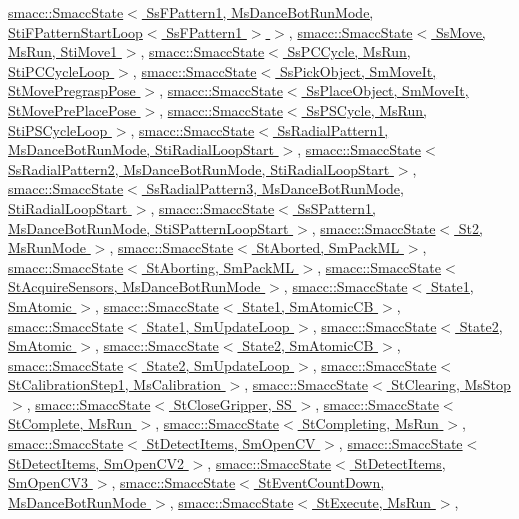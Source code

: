 \hyperlink{classsmacc_1_1SmaccState}{smacc\+::\+Smacc\+State$<$ Ss\+F\+Pattern1, Ms\+Dance\+Bot\+Run\+Mode, Sti\+F\+Pattern\+Start\+Loop$<$ Ss\+F\+Pattern1 $>$ $>$}, \hyperlink{classsmacc_1_1SmaccState}{smacc\+::\+Smacc\+State$<$ Ss\+Move, Ms\+Run, Sti\+Move1 $>$}, \hyperlink{classsmacc_1_1SmaccState}{smacc\+::\+Smacc\+State$<$ Ss\+P\+C\+Cycle, Ms\+Run, Sti\+P\+C\+Cycle\+Loop $>$}, \hyperlink{classsmacc_1_1SmaccState}{smacc\+::\+Smacc\+State$<$ Ss\+Pick\+Object, Sm\+Move\+It, St\+Move\+Pregrasp\+Pose $>$}, \hyperlink{classsmacc_1_1SmaccState}{smacc\+::\+Smacc\+State$<$ Ss\+Place\+Object, Sm\+Move\+It, St\+Move\+Pre\+Place\+Pose $>$}, \hyperlink{classsmacc_1_1SmaccState}{smacc\+::\+Smacc\+State$<$ Ss\+P\+S\+Cycle, Ms\+Run, Sti\+P\+S\+Cycle\+Loop $>$}, \hyperlink{classsmacc_1_1SmaccState}{smacc\+::\+Smacc\+State$<$ Ss\+Radial\+Pattern1, Ms\+Dance\+Bot\+Run\+Mode, Sti\+Radial\+Loop\+Start $>$}, \hyperlink{classsmacc_1_1SmaccState}{smacc\+::\+Smacc\+State$<$ Ss\+Radial\+Pattern2, Ms\+Dance\+Bot\+Run\+Mode, Sti\+Radial\+Loop\+Start $>$}, \hyperlink{classsmacc_1_1SmaccState}{smacc\+::\+Smacc\+State$<$ Ss\+Radial\+Pattern3, Ms\+Dance\+Bot\+Run\+Mode, Sti\+Radial\+Loop\+Start $>$}, \hyperlink{classsmacc_1_1SmaccState}{smacc\+::\+Smacc\+State$<$ Ss\+S\+Pattern1, Ms\+Dance\+Bot\+Run\+Mode, Sti\+S\+Pattern\+Loop\+Start $>$}, \hyperlink{classsmacc_1_1SmaccState}{smacc\+::\+Smacc\+State$<$ St2, Ms\+Run\+Mode $>$}, \hyperlink{classsmacc_1_1SmaccState}{smacc\+::\+Smacc\+State$<$ St\+Aborted, Sm\+Pack\+M\+L $>$}, \hyperlink{classsmacc_1_1SmaccState}{smacc\+::\+Smacc\+State$<$ St\+Aborting, Sm\+Pack\+M\+L $>$}, \hyperlink{classsmacc_1_1SmaccState}{smacc\+::\+Smacc\+State$<$ St\+Acquire\+Sensors, Ms\+Dance\+Bot\+Run\+Mode $>$}, \hyperlink{classsmacc_1_1SmaccState}{smacc\+::\+Smacc\+State$<$ State1, Sm\+Atomic $>$}, \hyperlink{classsmacc_1_1SmaccState}{smacc\+::\+Smacc\+State$<$ State1, Sm\+Atomic\+C\+B $>$}, \hyperlink{classsmacc_1_1SmaccState}{smacc\+::\+Smacc\+State$<$ State1, Sm\+Update\+Loop $>$}, \hyperlink{classsmacc_1_1SmaccState}{smacc\+::\+Smacc\+State$<$ State2, Sm\+Atomic $>$}, \hyperlink{classsmacc_1_1SmaccState}{smacc\+::\+Smacc\+State$<$ State2, Sm\+Atomic\+C\+B $>$}, \hyperlink{classsmacc_1_1SmaccState}{smacc\+::\+Smacc\+State$<$ State2, Sm\+Update\+Loop $>$}, \hyperlink{classsmacc_1_1SmaccState}{smacc\+::\+Smacc\+State$<$ St\+Calibration\+Step1, Ms\+Calibration $>$}, \hyperlink{classsmacc_1_1SmaccState}{smacc\+::\+Smacc\+State$<$ St\+Clearing, Ms\+Stop $>$}, \hyperlink{classsmacc_1_1SmaccState}{smacc\+::\+Smacc\+State$<$ St\+Close\+Gripper, S\+S $>$}, \hyperlink{classsmacc_1_1SmaccState}{smacc\+::\+Smacc\+State$<$ St\+Complete, Ms\+Run $>$}, \hyperlink{classsmacc_1_1SmaccState}{smacc\+::\+Smacc\+State$<$ St\+Completing, Ms\+Run $>$}, \hyperlink{classsmacc_1_1SmaccState}{smacc\+::\+Smacc\+State$<$ St\+Detect\+Items, Sm\+Open\+C\+V $>$}, \hyperlink{classsmacc_1_1SmaccState}{smacc\+::\+Smacc\+State$<$ St\+Detect\+Items, Sm\+Open\+C\+V2 $>$}, \hyperlink{classsmacc_1_1SmaccState}{smacc\+::\+Smacc\+State$<$ St\+Detect\+Items, Sm\+Open\+C\+V3 $>$}, \hyperlink{classsmacc_1_1SmaccState}{smacc\+::\+Smacc\+State$<$ St\+Event\+Count\+Down, Ms\+Dance\+Bot\+Run\+Mode $>$}, \hyperlink{classsmacc_1_1SmaccState}{smacc\+::\+Smacc\+State$<$ St\+Execute, Ms\+Run $>$}, 